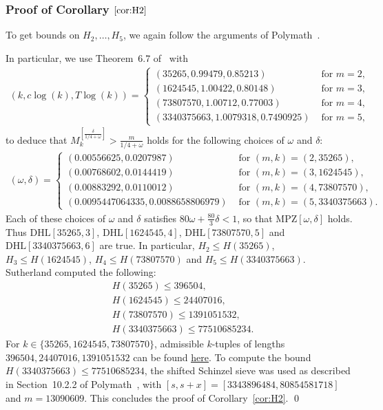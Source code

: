 \documentclass{amsart}
\numberwithin{equation}{section}
\begin{document}
 
\subsubsection{Proof of Corollary $\ref{cor:H2}$}
To get bounds on $H_2, \dots , H_5$, we again follow the arguments of Polymath~\cite{Polymath:2014:VSS}. 

\vspace{3mm} In particular, we use Theorem~6.7 of~\cite{Polymath:2014:VSS} with 
\begin{align*}
(k,c \log(k),T \log(k)) = \begin{cases} 
(35265,  0.99479, 0.85213) &\mbox{ for }  m=2, \\
(1624545, 1.00422, 0.80148)  &\mbox{ for }  m=3, \\
(73807570,  1.00712, 0.77003)  &\mbox{ for }  m=4, \\
(3340375663,  1.0079318,  0.7490925)  &\mbox{ for } m=5,
\end{cases}
\end{align*}
to deduce that  
$M_{k}^{[\frac{\delta}{1/4+\omega}]} > \frac{m}{1/4+\omega}$ holds for the following choices of $\omega$ and $\delta$:
\begin{align*}
(\omega,\delta) = \begin{cases}
(0.00556625,  0.0207987) &\mbox{ for } (m,k) = (2,35265), \\
(0.00768602,  0.0144419) &\mbox{ for } (m,k) = (3,1624545), \\
(0.00883292,  0.0110012 ) &\mbox{ for } (m,k) = (4,73807570), \\
(0.0095447064335,  0.0088658806979) &\mbox{ for } (m,k) = (5,3340375663).
\end{cases}
\end{align*}
Each of these choices of $\omega$ and $\delta$ satisfies $80 \omega +\frac{80}{3}\delta  <  1$, so that $\mbox{MPZ}[\omega,\delta]$ holds. Thus $\mbox{DHL}[35265,3]$, $\mbox{DHL}[1624545,4]$, $\mbox{DHL}[73807570,5]$ and $\mbox{DHL}[3340375663,6]$ are true.   
In particular, $H_2 \leq H(35265)$, $H_3 \leq H(1624545)$, $H_4 \leq H(73807570)$ and $H_5 \leq H(3340375663)$. Sutherland computed the following:
\begin{align*}
&H(35265) \leq 396504, \\
&H(1624545) \leq 24407016,  \\
&H(73807570) \leq 1391051532, \\
&H(3340375663) \leq 77510685234.
\end{align*} 
 For $k \in \{35265, 1624545,  73807570\}$, admissible $k$-tuples of lengths $396504,  24407016, 1391051532$ can be found \href{https://www.dropbox.com/scl/fo/9my1skgb657z2sc49tqls/h?rlkey=pq8snurxku4o1dbi1ta0ltqbf&dl=0}{{\color{blue}\underline{here}}}. To compute the bound $H(3340375663) \leq 77510685234$, the  shifted Schinzel sieve was used as described in Section~10.2.2 of Polymath~\cite{Polymath:2014:VSS}, with $ [s,s+x] =
[3343896484,80854581718]$ and $m=13090609$.
This concludes the proof of Corollary~\ref{cor:H2}. \qed
\end{document}
